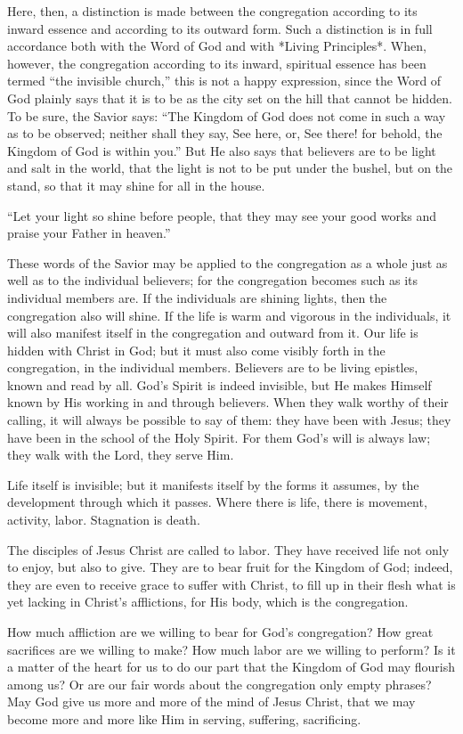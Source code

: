 Here, then, a distinction is made between the congregation according to its inward essence and according to its outward form. Such a distinction is in full accordance both with the Word of God and with *Living Principles*. When, however, the congregation according to its inward, spiritual essence has been termed “the invisible church,” this is not a happy expression, since the Word of God plainly says that it is to be as the city set on the hill that cannot be hidden. To be sure, the Savior says: “The Kingdom of God does not come in such a way as to be observed; neither shall they say, See here, or, See there! for behold, the Kingdom of God is within you.” But He also says that believers are to be light and salt in the world, that the light is not to be put under the bushel, but on the stand, so that it may shine for all in the house.

“Let your light so shine before people, that they may see your good works and praise your Father in heaven.”

These words of the Savior may be applied to the congregation as a whole just as well as to the individual believers; for the congregation becomes such as its individual members are. If the individuals are shining lights, then the congregation also will shine. If the life is warm and vigorous in the individuals, it will also manifest itself in the congregation and outward from it. Our life is hidden with Christ in God; but it must also come visibly forth in the congregation, in the individual members. Believers are to be living epistles, known and read by all. God’s Spirit is indeed invisible, but He makes Himself known by His working in and through believers. When they walk worthy of their calling, it will always be possible to say of them: they have been with Jesus; they have been in the school of the Holy Spirit. For them God’s will is always law; they walk with the Lord, they serve Him.

Life itself is invisible; but it manifests itself by the forms it assumes, by the development through which it passes. Where there is life, there is movement, activity, labor. Stagnation is death.

The disciples of Jesus Christ are called to labor. They have received life not only to enjoy, but also to give. They are to bear fruit for the Kingdom of God; indeed, they are even to receive grace to suffer with Christ, to fill up in their flesh what is yet lacking in Christ’s afflictions, for His body, which is the congregation.

How much affliction are we willing to bear for God’s congregation? How great sacrifices are we willing to make? How much labor are we willing to perform? Is it a matter of the heart for us to do our part that the Kingdom of God may flourish among us? Or are our fair words about the congregation only empty phrases? May God give us more and more of the mind of Jesus Christ, that we may become more and more like Him in serving, suffering, sacrificing.

